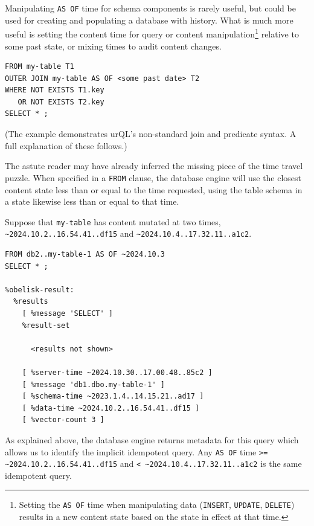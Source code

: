 \documentclass[twoside]{article}
\begin{document}
Manipulating \lstinline[style=inlinecode]{AS OF} time for schema components is rarely useful, but could be used for creating and populating a database with history. What is much more useful is setting the content time for query or content manipulation\footnote{Setting the \lstinline[style=inlinecode]{AS OF} time when manipulating data (\lstinline[style=inlinecode]{INSERT}, \lstinline[style=inlinecode]{UPDATE}, \lstinline[style=inlinecode]{DELETE}) results in a new content state based on the state in effect at that time.} relative to some past state, or mixing times to audit content changes.

\begin{lstlisting}[style=listingcode_sql]
FROM my-table T1
OUTER JOIN my-table AS OF <some past date> T2
WHERE NOT EXISTS T1.key
   OR NOT EXISTS T2.key
SELECT * ;
\end{lstlisting}

\noindent
(The example demonstrates urQL’s non-standard join and predicate syntax. A full explanation of these follows.)

The astute reader may have already inferred the missing piece of the time travel puzzle. When specified in a \lstinline[style=inlinecode]{FROM} clause, the database engine will use the closest content state less than or equal to the time requested, using the table schema in a state likewise less than or equal to that time.

\sloppy
Suppose that \lstinline[style=inlinecode]{my-table} has content mutated at two times, \lstinline[style=inlinecode]{~2024.10.2..16.54.41..df15} and \lstinline[style=inlinecode]{~2024.10.4..17.32.11..a1c2}.

\begin{lstlisting}[style=listingcode_sql]
FROM db2..my-table-1 AS OF ~2024.10.3
SELECT * ;

%obelisk-result:
  %results
    [ %message 'SELECT' ]
    %result-set

      <results not shown>

    [ %server-time ~2024.10.30..17.00.48..85c2 ]
    [ %message 'db1.dbo.my-table-1' ]
    [ %schema-time ~2023.1.4..14.15.21..ad17 ]
    [ %data-time ~2024.10.2..16.54.41..df15 ]
    [ %vector-count 3 ]
\end{lstlisting}

\noindent
As explained above, the database engine returns metadata for this query which allows us to identify the implicit idempotent query. Any \lstinline[style=inlinecode]{AS OF} time \lstinline[style=inlinecode]{>= ~2024.10.2..16.54.41..df15} and \lstinline[style=inlinecode]{< ~2024.10.4..17.32.11..a1c2} is the same idempotent query.
\end{document}
